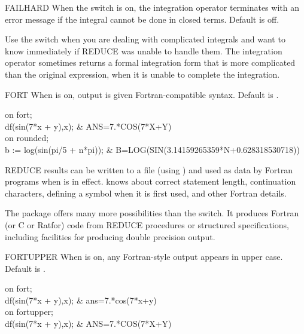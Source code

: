 \begin{Switch}[failhard]{FAILHARD}
When the  switch is on, the integration operator  
terminates with an error message if the integral cannot be done in closed 
terms.
Default is off.

\begin{Comments}
Use the  switch when you are dealing with complicated integrals
and want to know immediately if REDUCE was unable to handle them.  The
integration operator sometimes returns a formal integration form that is
more complicated than the original expression, when it is unable to
complete the integration.
\end{Comments}
\end{Switch}


\begin{Switch}[fort]{FORT}
When  is on, output is given Fortran-compatible syntax.  Default
is .

\begin{Examples}
on fort; \\
df(sin(7*x + y),x);          &     ANS=7.*COS(7*X+Y) \\
on rounded; \\
b := log(sin(pi/5 + n*pi));  &
	       B=LOG(SIN(3.14159265359*N+0.628318530718))
\end{Examples}

\begin{Comments}
REDUCE results can be written to a file (using ) and used as data
by Fortran programs when  is in effect.   knows about
correct statement length, continuation characters, defining a symbol when 
it is first used, and other Fortran details.

The  package offers many more possibilities than the
 switch.  It produces Fortran (or C or Ratfor) code from REDUCE
procedures or structured specifications, including facilities for producing
double precision output.
\end{Comments}
\end{Switch}

\begin{Switch}[fortupper]{FORTUPPER}
When  is on, any Fortran-style output appears in upper case.
Default is .

\begin{Examples}
on fort; \\
df(sin(7*x + y),x);          &     ans=7.*cos(7*x+y) \\
on fortupper; \\
df(sin(7*x + y),x);          &     ANS=7.*COS(7*X+Y) \\
\end{Examples}
\end{Switch}



